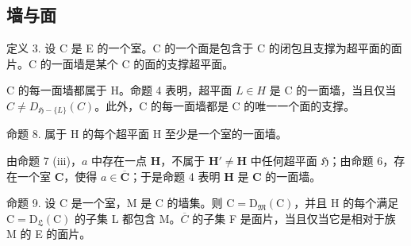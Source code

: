 \subsection{墙与面}

定义 3. 设 C 是 E 的一个室。C 的一个面是包含于 C 的闭包且支撑为超平面的面片。C 的一面墙是某个 C 的面的支撑超平面。

C 的每一面墙都属于 H。命题 4 表明，超平面 \(L \in H\) 是 C 的一面墙，当且仅当 \(C \neq D_{\mathfrak{H} - \{L\}}(C)\)。此外，C 的每一面墙都是 C 的唯一一个面的支撑。

命题 8. 属于 H 的每个超平面 H 至少是一个室的一面墙。

由命题 7 (iii)，\(a\) 中存在一点 \(\mathbf{H}\)，不属于 \(\mathbf{H}' \neq \mathbf{H}\) 中任何超平面 \(\mathfrak{H}\)；由命题 6，存在一个室 \(\mathbf{C}\)，使得 \(a \in \overline{\mathbf{C}}\)；于是命题 4 表明 \(\mathbf{H}\) 是 \(\mathbf{C}\) 的一面墙。

命题 9. 设 C 是一个室，M 是 C 的墙集。则 \(\mathrm{C} = \mathrm{D}_{\mathfrak{M}}(\mathrm{C})\)，并且 H 的每个满足 \(\mathrm{C} = \mathrm{D}_{\mathfrak{L}}(\mathrm{C})\) 的子集 L 都包含 M。\(\overline{C}\) 的子集 F 是面片，当且仅当它是相对于族 M 的 E 的面片。

